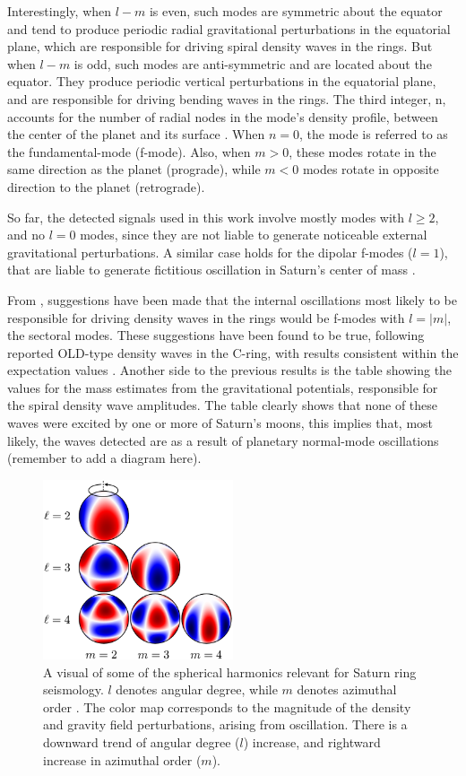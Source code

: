 \documentclass[conference]{IEEEtran}
\begin{document}
Interestingly, when $l-m$ is even, such modes are symmetric about the equator and tend to produce periodic radial gravitational perturbations in the equatorial plane, which are responsible for driving spiral density waves in the rings. But when $l-m$ is odd, such modes are anti-symmetric and are located about the equator. They produce periodic vertical perturbations in the equatorial plane, and are responsible for driving bending waves in the rings. The third integer, n, accounts for the number of radial nodes in the mode's density profile, between the center of the planet and its surface \cite{FRENCH2021114660}. When $n=0$, the mode is referred to as the fundamental-mode (f-mode). Also, when $m>0$, these modes rotate in the same direction as the planet (prograde), while $m<0$ modes rotate in opposite direction to the planet (retrograde). 

So far, the detected signals used in this work involve mostly modes with $l\geq 2$, and no $l=0$ modes, since they are not liable to generate noticeable external gravitational perturbations. A similar case holds for the dipolar f-modes ($l=1$), that are liable to generate fictitious oscillation in Saturn's center of mass \cite{FRENCH2021114660}.

From \cite{Marley1993PlanetaryAM} \cite{FRENCH2021114660}, suggestions have been made that the internal oscillations most likely to be responsible for driving density waves in the rings would be f-modes with $l=|m|$, the sectoral modes. These suggestions have been found to be true, following reported OLD-type density waves in the C-ring, with results consistent within the expectation values \cite{Hedman_2013} \cite{10.1093/mnras/stu1503}. Another side to the previous results is the table showing the values for the mass estimates from the gravitational potentials, responsible for the spiral density wave amplitudes. The table clearly shows that none of these waves were excited by one or more of Saturn's moons, this implies that, most likely, the waves detected are as a result of planetary normal-mode oscillations (remember to add a diagram here).
\begin{figure}[h] 
\centering
\includegraphics[width=0.5\textwidth]{mankovitch2.png}
\caption{A visual of some of the spherical harmonics relevant for Saturn ring seismology. $l$ denotes angular degree, while $m$ denotes azimuthal order \cite{Mankovich_2019}.  The color map corresponds to the magnitude of the density and gravity field perturbations, arising from oscillation. There is a downward trend of angular
degree ($l$) increase, and rightward increase in azimuthal order ($m$).} \label{fig:my_label}
\end{figure}
\end{document}
